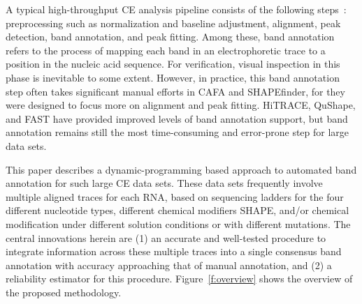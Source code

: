 A typical high-throughput CE analysis pipeline consists of the following steps~\citep{Yoon2011,Karabiber2013,Kladwang2014}: preprocessing such as normalization and baseline adjustment, alignment, peak detection, band annotation, and peak fitting. Among these, band annotation refers to the process of mapping each band in an electrophoretic trace to a position in the nucleic acid sequence. For verification, visual inspection in this phase is inevitable to some extent. However, in practice, this band annotation step often takes significant manual efforts in CAFA and SHAPEfinder, for they were designed to focus more on alignment and peak fitting. HiTRACE, QuShape, and FAST have provided improved levels of band annotation support, but band annotation remains still the most time-consuming and error-prone step for large data sets.

This paper describes a dynamic-programming based approach to automated band annotation for such large CE data sets. These data sets frequently involve multiple aligned traces for each RNA, based on sequencing ladders for the four different nucleotide types, different chemical modifiers SHAPE, and/or chemical modification under different solution conditions or with different mutations. The central innovations herein are (1) an accurate and well-tested procedure to integrate information across these multiple traces into a single consensus band annotation with accuracy approaching that of manual annotation, and (2) a reliability estimator for this procedure. Figure~\ref{f:overview} shows the overview of the proposed methodology.


